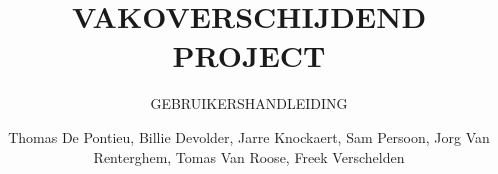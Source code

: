\documentclass[a4paper, twoside, 12pt]{ugent_report}
\begin{document}
\title{VAKOVERSCHIJDEND PROJECT}
\subtitle{GEBRUIKERSHANDLEIDING\\}
\author{Thomas De Pontieu, Billie Devolder, Jarre Knockaert, Sam Persoon, Jorg Van Renterghem, Tomas Van Roose, Freek Verschelden}
\maketitle

\restoregeometry
\newpage\null\thispagestyle{empty}\newpage
\end{document}
